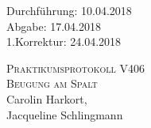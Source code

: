 

\begin{titlepage}
  \begin{flushleft}
 Durchführung: 10.04.2018\\
 Abgabe: 17.04.2018\\
1.Korrektur: 24.04.2018
  \end{flushleft}



 \begin{center}


\textsc{\LARGE Praktikumsprotokoll V406}\\[1.5cm]
\textsc{\huge Beugung am Spalt } \\[5,5cm]

Carolin Harkort\footnotemark[1], \\
Jacqueline Schlingmann\footnotemark[2] \\[1,0cm]



 \end{center}

 \vfill

\end{titlepage}


  
  

\nocite{*}
\printbibliography

